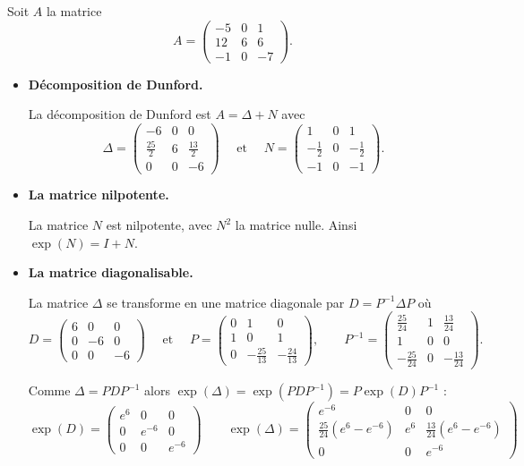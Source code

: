 \documentclass[12pt, class=report,crop=false]{standalone}
\begin{document}
\begin{exemple}
Soit $A$ la matrice 
$$A = \begin{pmatrix}
-5 & 0 & 1 \\
12 & 6 & 6 \\
-1 & 0 & -7
\end{pmatrix}.$$


\begin{itemize}
  \item \textbf{Décomposition de Dunford.}
  
La décomposition de Dunford est $A = \Delta + N$ avec 
$$\Delta  = \begin{pmatrix}
-6 & 0 & 0 \\
\frac{25}{2} & 6 & \frac{13}{2} \\
0 & 0 & -6
\end{pmatrix}
\quad \text{ et } \quad 
N = \begin{pmatrix}
1 & 0 & 1 \\
-\frac{1}{2} & 0 & -\frac{1}{2} \\
-1 & 0 & -1
\end{pmatrix}.$$

\item \textbf{La matrice nilpotente.}

La matrice $N$ est nilpotente, avec $N^2$ la matrice nulle.
Ainsi $\exp(N) = I + N$. 

\item \textbf{La matrice diagonalisable.}

La matrice $\Delta$ se transforme en une matrice diagonale par 
$D = P^{-1} \Delta P$ où
$$D = \begin{pmatrix}
6 & 0 & 0 \\
0 & -6 & 0 \\
0 & 0 & -6
\end{pmatrix}
\quad \text{ et } \quad
P = \begin{pmatrix} 
0 & 1 & 0 \\
1 & 0 & 1 \\
0 & -\frac{25}{13} & -\frac{24}{13}
\end{pmatrix}, \qquad
P^{-1} = \begin{pmatrix}
\frac{25}{24} & 1 & \frac{13}{24} \\
1 & 0 & 0 \\
-\frac{25}{24} & 0 & -\frac{13}{24}
\end{pmatrix}
.$$


Comme $\Delta = P D P^{-1}$ alors
$\exp(\Delta) = \exp(P D P^{-1})=P \exp(D) P^{-1}$ :
$$\exp(D) = 
\begin{pmatrix}
e^6 & 0 & 0 \\
0 & e^{-6} & 0 \\
0 & 0 & e^{-6}
\end{pmatrix}
\qquad
\exp(\Delta) =
\begin{pmatrix}
e^{-6} & 0 & 0 \\
\frac{25}{24}(e^{6} - e^{-6}) & e^{6} & \frac{13}{24} (e^{6} - e^{-6}) \\
0 & 0 & e^{-6}
\end{pmatrix}
$$



\end{itemize}
\end{exemple}
\end{document}

